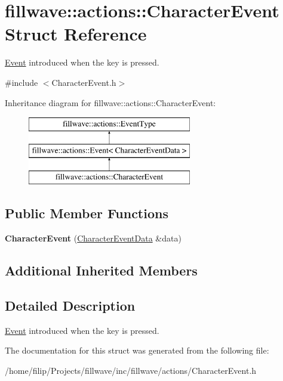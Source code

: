 \hypertarget{classfillwave_1_1actions_1_1CharacterEvent}{}\section{fillwave\+:\+:actions\+:\+:Character\+Event Struct Reference}
\label{classfillwave_1_1actions_1_1CharacterEvent}


\hyperlink{classfillwave_1_1actions_1_1Event}{Event} introduced when the key is pressed.  




{\ttfamily \#include $<$Character\+Event.\+h$>$}

Inheritance diagram for fillwave\+:\+:actions\+:\+:Character\+Event\+:\begin{figure}[H]
\begin{center}
\leavevmode
\includegraphics[height=3.000000cm]{classfillwave_1_1actions_1_1CharacterEvent}
\end{center}
\end{figure}
\subsection*{Public Member Functions}
\begin{DoxyCompactItemize}
\item 
\hypertarget{classfillwave_1_1actions_1_1CharacterEvent_acab3baf0d6290fbf51be493acd0af1a5}{}{\bfseries Character\+Event} (\hyperlink{structfillwave_1_1actions_1_1CharacterEventData}{Character\+Event\+Data} \&data)\label{classfillwave_1_1actions_1_1CharacterEvent_acab3baf0d6290fbf51be493acd0af1a5}

\end{DoxyCompactItemize}
\subsection*{Additional Inherited Members}


\subsection{Detailed Description}
\hyperlink{classfillwave_1_1actions_1_1Event}{Event} introduced when the key is pressed. 

The documentation for this struct was generated from the following file\+:\begin{DoxyCompactItemize}
\item 
/home/filip/\+Projects/fillwave/inc/fillwave/actions/Character\+Event.\+h\end{DoxyCompactItemize}
